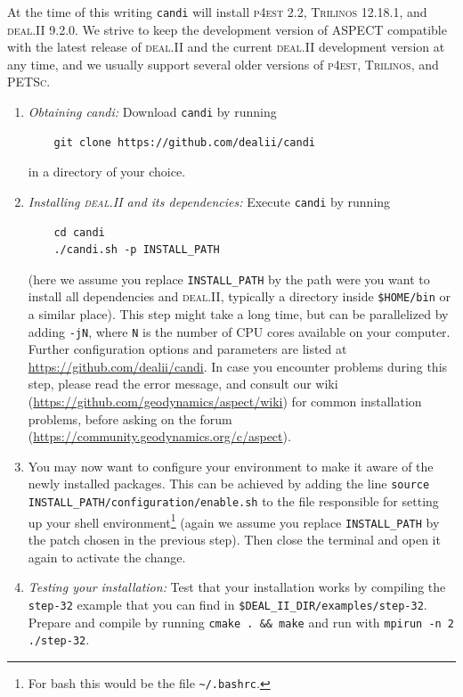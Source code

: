 \documentclass{article}
\newcommand{\dealii}{{\textsc{deal.II}}}
\newcommand{\pfrst}{{\normalfont\textsc{p4est}}}
\newcommand{\trilinos}{{\textsc{Trilinos}}}
\newcommand{\petsc}{{\textsc{PETSc}}}
\newcommand{\aspect}{\textsc{ASPECT}}
\begin{document}
At the time of this writing \texttt{candi} will install \pfrst{} 2.2,
\trilinos{} 12.18.1, and \dealii{} 9.2.0.
We strive to keep the development version of \aspect{} compatible with
the latest release of \dealii{} and the current \dealii{} development
version at any time, and we usually support several older versions of
\pfrst{}, \trilinos{}, and \petsc{}.

\begin{enumerate}
\item \textit{Obtaining candi:} Download \texttt{candi} by running
    \begin{verbatim}
    git clone https://github.com/dealii/candi
    \end{verbatim}
    in a directory of your choice.

\item \textit{Installing \dealii{} and its dependencies:} Execute \texttt {candi} by running
    \begin{verbatim}
    cd candi
    ./candi.sh -p INSTALL_PATH
    \end{verbatim}
    (here we assume you replace \texttt{INSTALL\_PATH} by the path were
    you want to install all dependencies and \dealii{}, typically a directory inside
    \texttt{\$HOME/bin} or a similar place).
    This step might take a long time, but can be parallelized by adding
    \texttt{-jN}, where
    \texttt{N} is the number of CPU cores available on your computer. Further configuration options
    and parameters are listed at \url{https://github.com/dealii/candi}. In case you encounter
    problems during this step, please read the error message, and consult our wiki
    (\url{https://github.com/geodynamics/aspect/wiki}) for common installation problems,
    before asking on the forum (\url{https://community.geodynamics.org/c/aspect}).

\item You may now want to configure your environment to make it aware of the newly installed
    packages. This can be achieved by adding the line
    \texttt{source INSTALL\_PATH/configuration/enable.sh} to the file responsible for setting
    up your shell environment\footnote{For bash this would be the file \texttt{\~{}/.bashrc}.}
    (again we assume you replace \texttt{INSTALL\_PATH} by the patch chosen in the previous step).
    Then close the terminal and open it again to activate the change.

\item \textit{Testing your installation:} Test that your installation works
  by compiling the {\texttt{step-32}} example that you can find in
  {\texttt{\$DEAL\_II\_DIR/examples/step-32}}. Prepare and compile by running {\texttt{cmake . \&\& make}}
  and run with {\texttt{mpirun -n 2 ./step-32}}.

\end{enumerate}
\end{document}
